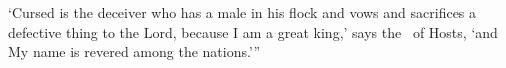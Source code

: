 \begin{inparaenum}
   `Cursed is the deceiver who has a male in his flock and vows and sacrifices a defective thing to the Lord, because I am a great king,' says the \lord\ of Hosts, `and My name is revered among the nations.'\thinspace''%
\end{inparaenum}
